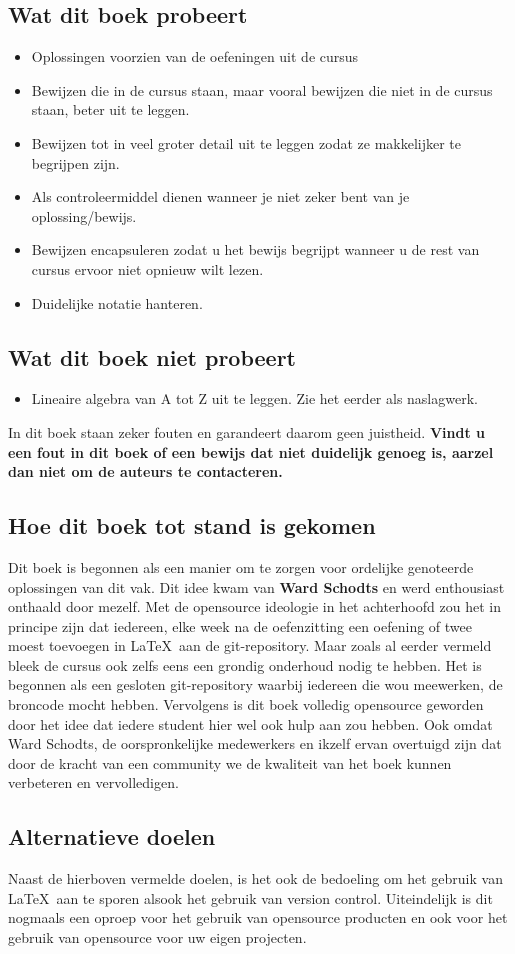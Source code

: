 \documentclass[lineaire_algebra_oplossingen.tex]{subfiles}
\begin{document}
\subsection*{Wat dit boek probeert}
\begin{itemize}
\item Oplossingen voorzien van de oefeningen uit de cursus
\item Bewijzen die in de cursus staan, maar vooral bewijzen die niet in de cursus staan, beter uit te leggen.
\item Bewijzen tot in veel groter detail uit te leggen zodat ze makkelijker te begrijpen zijn. 
\item Als controleermiddel dienen wanneer je niet zeker bent van je oplossing/bewijs.
\item Bewijzen encapsuleren zodat u het bewijs begrijpt wanneer u de rest van cursus ervoor niet opnieuw wilt lezen. 
\item Duidelijke notatie hanteren.
\end{itemize}
\subsection*{Wat dit boek niet probeert}
\begin{itemize}
\item Lineaire algebra van A tot Z uit te leggen. Zie het eerder als naslagwerk.
\end{itemize}
In dit boek staan zeker fouten en garandeert daarom geen juistheid.
\textbf{Vindt u een fout in dit boek of een bewijs dat niet duidelijk genoeg is, aarzel dan niet om de auteurs te contacteren.}
\newpage
\subsection*{Hoe dit boek tot stand is gekomen}
Dit boek is begonnen als een manier om te zorgen voor ordelijke genoteerde oplossingen van dit vak.
Dit idee kwam van \textbf{Ward Schodts} en werd enthousiast onthaald door mezelf.
Met de opensource ideologie in het achterhoofd zou het in principe zijn dat iedereen, elke week na de oefenzitting een oefening of twee moest toevoegen in \LaTeX \ aan de git-repository.
Maar zoals al eerder vermeld bleek de cursus ook zelfs eens een grondig onderhoud nodig te hebben.
Het is begonnen als een gesloten git-repository waarbij iedereen die wou meewerken, de broncode mocht hebben.
Vervolgens is dit boek volledig opensource geworden door het idee dat iedere student hier wel ook hulp aan zou hebben.
Ook omdat Ward Schodts, de oorspronkelijke medewerkers en ikzelf ervan overtuigd zijn dat door de kracht van een community we de kwaliteit van het boek kunnen verbeteren en vervolledigen.

\subsection*{Alternatieve doelen}
Naast de hierboven vermelde doelen, is het ook de bedoeling om het gebruik van \LaTeX \ aan te sporen alsook het gebruik van version control.
Uiteindelijk is dit nogmaals een oproep voor het gebruik van opensource producten en ook voor het gebruik van opensource voor uw eigen projecten.
\end{document}
